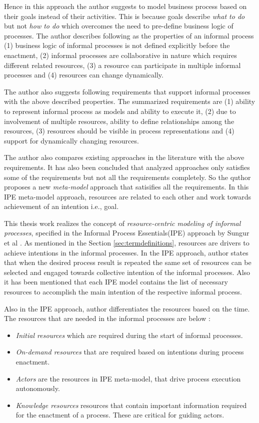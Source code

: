 Hence in this approach the author suggests to model business process based on their goals instead of their activities. This is because goals describe \textit{what to do} but not \textit{how to do} which overcomes the need to pre-define business logic of processes. The author describes following as the properties of an informal process (1) business logic of informal processes is not defined explicitly before the enactment, (2) informal processes are collaborative in nature which requires different related resources, (3) a resource can participate in multiple informal processes and (4) resources can change dynamically.

The author also suggests following requirements that support informal processes with the above described properties. The summarized requirements are (1) ability to represent informal process as models and ability to execute it, (2) due to involvement of multiple resources, ability to define relationships among the resources, (3) resources should be visible in process representations and (4) support for dynamically changing resources. 

The author also compares existing approaches in the literature with the above requirements. It has also been concluded that analyzed approaches only satisfies some of the requirements but not all the requirements completely. So the quthor proposes a new \textit{meta-model} approach that satisifies all the requirements. In this IPE meta-model approach, resources are related to each other and work towards achievement of an intention i.e., goal.   

This thesis work realizes the concept of \textit{resource-centric modeling of informal processes}, specified in the Informal Process Essentials(IPE) approach by Sungur et al \cite{Sungur2014a}.  As mentioned in the Section \ref{sec:termdefinitions}, resources are drivers to achieve intentions in the informal processes. In the IPE approach, author states that when the desired process result is repeated the same set of resources can be selected and engaged towards collective intention of the informal processes. Also it has been mentioned that each IPE model contains the list of necessary resources to accomplish the main intention of the respective informal process.

Also in the IPE approach, author differentiates the resources based on the time. The resources that are needed in the informal processes are below :
  \begin{itemize}
  	\item \textit{Initial resources} which are required during the start of informal processes.
  	\item \textit{On-demand resources} that are required based on intentions during process enactment.
  	\item \textit{Actors} are the resources in IPE meta-model, that drive process execution autonomously.
  	\item \textit{Knowledge resources} resources that contain important information required for the enactment of a process. These are critical for guiding actors.  
  \end{itemize}
 
